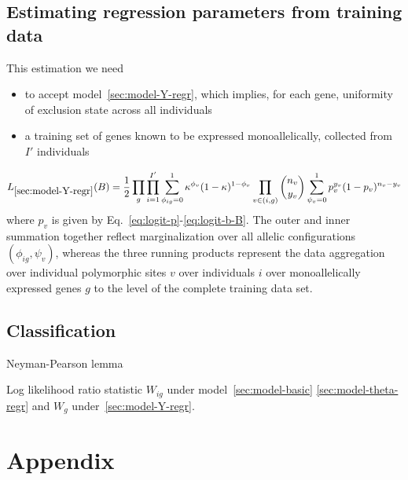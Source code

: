 \documentclass[letterpaper]{article}
\begin{document}
\subsection{Estimating regression parameters from training data}
\label{sec:beta-from-training-data}

This estimation we need
\begin{itemize}
\item to accept model~\ref{sec:model-Y-regr}, which implies, for each gene,
uniformity of exclusion state across all individuals
\item a training set of genes known to be expressed monoallelically, collected
from \(I'\) individuals
\end{itemize}

\begin{eqnarray}
L_{\ref{sec:model-Y-regr}}(B) = \frac{1}{2} \prod_{g} \prod_{i=1}^{I'}
\sum_{\phi_{ig}=0}^1 \kappa^{\phi_v} (1 - \kappa)^{1-\phi_v}
\prod_{v\in(i,g)}
\binom{n_v}{y_v}
\sum_{\psi_v=0}^1
p_v^{y_v} (1-p_v)^{n_v-y_v}
\end{eqnarray}
where \(p_v\) is given by Eq.~\ref{eq:logit-p}-\ref{eq:logit-b-B}.  The outer
and inner summation together reflect marginalization over all allelic configurations
\((\phi_{ig},\psi_v)\), whereas the three running products represent the data aggregation
over individual polymorphic sites \(v\) over individuals \(i\) over
monoallelically expressed genes
\(g\) to the level of the complete training data set.

\subsection{Classification}

Neyman-Pearson lemma

Log likelihood ratio statistic \(W_{ig}\) under model~\ref{sec:model-basic}
\ref{sec:model-theta-regr} and \(W_g\) under~\ref{sec:model-Y-regr}.

\section{Appendix}
\label{sec:appendix}
\end{document}
